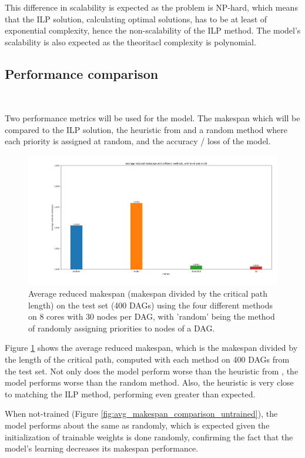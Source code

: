 This difference in scalability is expected as the problem is NP-hard,
which means that the ILP solution, calculating optimal solutions,
has to be at least of exponential complexity, hence the non-scalability of the ILP method.
The model's scalability is also expected as the theoritacl complexity
is polynomial.


\subsection{Performance comparison}
~

Two performance metrics will be used for the model.
The makespan which will be compared to the ILP solution, the heuristic
from \citet{zhao2020DAGsched} and a random method where each priority is assigned at random,
and the accuracy / loss of the model.

\begin{figure}
    \centering
    \includegraphics[width=\linewidth]{images/avg_makespan_m8n30.png}
    \caption{Average reduced makespan (makespan divided by the critical path length) on the test set (400 DAGs) using the four different methods
    on 8 cores with 30 nodes per DAG,
    with 'random' being the method of randomly assigning priorities to nodes of a DAG.}
    \label{fig:avg_makespan_comparison_trained}
\end{figure}

Figure \ref{fig:avg_makespan_comparison_trained} shows the average
reduced makespan, which is the makespan divided by the length of the critical path,
computed with each method on 400 DAGs from the test set.
Not only does the model perform worse than the heuristic from \citet{zhao2020DAGsched},
the model performs worse than the random method.
Also, the heuristic is very close to matching the ILP method,
performing even greater than expected.

When not-trained (Figure \ref{fig:avg_makespan_comparison_untrained}), the model performs 
about the same as randomly, which is expected
given the initialization of trainable weights is done randomly,
confirming the fact that the model's learning decreases its makespan performance.


